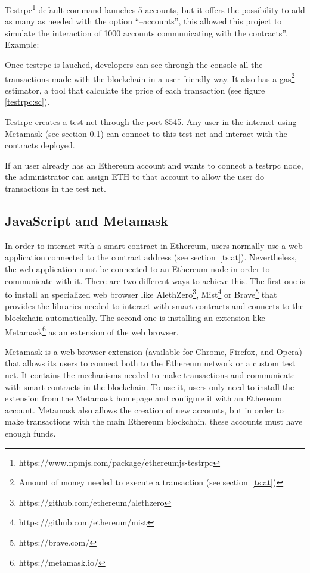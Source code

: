 \begin{itemize}
  Testrpc\footnote{https://www.npmjs.com/package/ethereumjs-testrpc} default
  command launches 5 accounts, but it offers the possibility to add as many as
  needed with the option ``--accounts'', this allowed this project to simulate
  the interaction of 1000 accounts communicating with the contracts''. Example:

   Once testrpc is lauched, developers can see through
  the console all the transactions made with the blockchain in a user-friendly
  way. It also has a gas\footnote{Amount of money needed to execute a
    transaction (see section~\ref{ts:at})} estimator, a tool that calculate the
  price of each transaction (see figure \ref{testrpc:sc}).

   Testrpc creates a test net through the port 8545. Any
  user in the internet using Metamask (see section \ref{jsmm}) can connect to
  this test net and interact with the contracts deployed.

   If an user already has an Ethereum
  account and wants to connect a testrpc node, the administrator can assign ETH
  to that account to allow the user do transactions in the test net.
\end{itemize}

\subsection{JavaScript and Metamask}
\label{jsmm}

In order to interact with a smart contract in Ethereum, users normally use a web
application connected to the contract address (see section~\ref{ts:at}).
Nevertheless, the web application must be connected to an Ethereum node in order
to communicate with it. There are two different ways to achieve this. The first
one is to install an specialized web browser like
AlethZero\footnote{https://github.com/ethereum/alethzero},
Mist\footnote{https://github.com/ethereum/mist} or
Brave\footnote{https://brave.com/} that provides the libraries needed to interact
with smart contracts and connects to the blockchain automatically. The second
one is installing an extension like Metamask\footnote{https://metamask.io/} as
an extension of the web browser.


Metamask is a web browser extension (available for Chrome, Firefox, and Opera)
that allows its users to connect both to the Ethereum network or a custom test
net. It contains the mechanisms needed to make transactions and communicate with
smart contracts in the blockchain. To use it, users only need to install the
extension from the Metamask homepage and configure it with an Ethereum account.
Metamask also allows the creation of new accounts, but in order to make
transactions with the main Ethereum blockchain, these accounts must have enough
funds.

